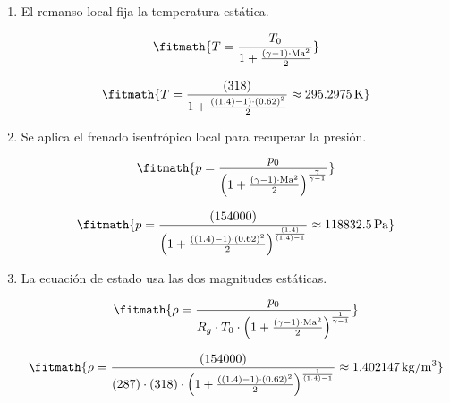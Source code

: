 \begin{enumerate}

\item El remanso local fija la temperatura estática.

\[\fitmath{T=\frac{T_0}{1+\frac{\left(\gamma-1\right)\cdot {\mathrm{Ma}}^{2}}{2}}}\]

\[\fitmath{T=\frac{(318)}{1+\frac{\left((1.4)-1\right)\cdot {(0.62)}^{2}}{2}}\approx 295.2975\,\mathrm{K}}\]

\item Se aplica el frenado isentrópico local para recuperar la presión.

\[\fitmath{p=\frac{p_0}{{\left(1+\frac{\left(\gamma-1\right)\cdot {\mathrm{Ma}}^{2}}{2}\right)}^{\frac{\gamma}{\gamma-1}}}}\]

\[\fitmath{p=\frac{(154000)}{{\left(1+\frac{\left((1.4)-1\right)\cdot {(0.62)}^{2}}{2}\right)}^{\frac{(1.4)}{(1.4)-1}}}\approx 118832.5\,\mathrm{Pa}}\]

\item La ecuación de estado usa las dos magnitudes estáticas.

\[\fitmath{\rho=\frac{p_0}{R_g\cdot T_0\cdot {\left(1+\frac{\left(\gamma-1\right)\cdot {\mathrm{Ma}}^{2}}{2}\right)}^{\frac{1}{\gamma-1}}}}\]

\[\fitmath{\rho=\frac{(154000)}{(287)\cdot (318)\cdot {\left(1+\frac{\left((1.4)-1\right)\cdot {(0.62)}^{2}}{2}\right)}^{\frac{1}{(1.4)-1}}}\approx 1.402147\,\mathrm{kg/m^{3}}}\]

\end{enumerate}
